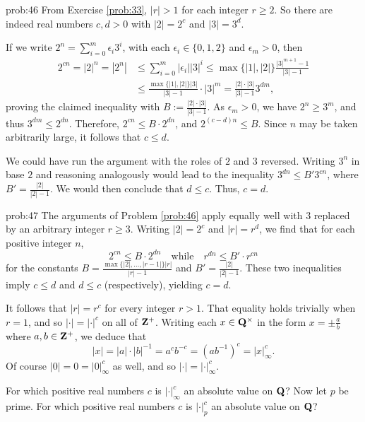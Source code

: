 \begin{sol}{prob:46} From Exercise \ref{prob:33}, $|r| > 1$ for each integer $r\ge 2$. So there are indeed real numbers $c,d >0$ with $|2| = 2^c$ and $|3| = 3^d$. 

If we write $2^n = \sum_{i=0}^{m} \epsilon_i 3^i$, with each $\epsilon_i \in \{0,1,2\}$ and $\epsilon_m > 0$, then 
\begin{align*} 2^{cn} = |2|^n = |2^n| &\le \sum_{i=0}^{m} |\epsilon_i| |3|^i \le \max\{|1|,|2|\} \frac{|3|^{m+1}-1}{|3|-1} \\&\le \frac{\max\{|1|,|2|\} |3|}{|3|-1} \cdot |3|^{m} = \frac{|2|\cdot |3|}{|3|-1} 3^{dm},
\end{align*}
proving the claimed inequality with $B := \frac{|2|\cdot |3|}{|3|-1}$. As $\epsilon_m > 0$, we have $2^n \ge 3^m$, and thus $3^{dm} \le 2^{dn}$. Therefore, $2^{cn} \le B \cdot 2^{dn}$, and $2^{(c-d)n} \le B$. Since $n$ may be taken arbitrarily large, it follows that $c\le d$.

We could have run the argument with the roles of $2$ and $3$ reversed. Writing $3^n$ in base $2$ and reasoning analogously would lead to the inequality $3^{dn} \le B' 3^{cn}$, where $B' = \frac{|2|}{|2|-1}$. We would then conclude that $d \le c$. Thus, $c=d$.
\end{sol}

\begin{sol}{prob:47} The arguments of Problem \ref{prob:46} apply equally well with $3$ replaced by an arbitrary integer $r \ge 3$. Writing $|2| = 2^{c}$ and $|r| = r^{d}$, we find that for each positive integer $n$,
\[ 2^{cn} \le B\cdot 2^{dn}\quad\text{while}\quad r^{dn} \le B'\cdot r^{cn} \]
for the constants $B = \frac{\max\{ |2|,\dots,|r-1|\} |r|}{|r|-1}$ and $B' = \frac{|2|}{|2|-1}$. These two inequalities imply $c\le d$ and $d\le c$ (respectively), yielding $c=d$. 

It follows that $|r| = r^{c}$ for every integer $r> 1$. That equality holds trivially when $r=1$, and so $|\cdot| = |\cdot|^{c}$ on all of $\mathbf{Z}^{+}$. Writing each $x \in \mathbf{Q}^{\times}$ in the form $x= \pm \frac{a}{b}$ where $a,b \in \mathbf{Z}^{+}$, we deduce that
\[ |x| = |a| \cdot |b|^{-1} = a^{c} b^{-c} = (a b^{-1})^{c} = |x|_{\infty}^{c}.\]
Of course $|0| = 0 = |0|_{\infty}^{c}$ as well, and so $|\cdot| = |\cdot|_{\infty}^c$.
\end{sol}

\begin{challenge} For which positive real numbers $c$ is $|\cdot|_{\infty}^{c}$ an absolute value on $\mathbf{Q}$? Now let $p$ be prime. For which positive real numbers $c$ is $|\cdot|_p^{c}$ an absolute value on $\mathbf{Q}$?

\end{challenge}

